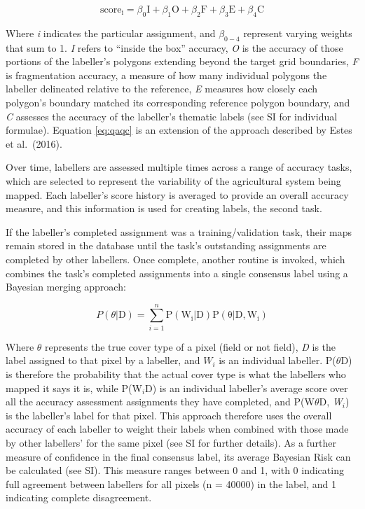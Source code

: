 \documentclass[11pt,a4paper]{article}
\begin{document}
\begin{equation} \label{eq:qaqc}
\mathrm{score_i}=\beta_0\mathrm{I}+\beta_1\mathrm{O}+\beta_2\mathrm{F}+\beta_3\mathrm{E}+\beta_4\mathrm{C}
\end{equation}

Where \emph{i} indicates the particular assignment, and \(\beta_{0-4}\)
represent varying weights that sum to 1. \emph{I} refers to ``inside the
box'' accuracy, \emph{O} is the accuracy of those portions of the
labeller's polygons extending beyond the target grid boundaries,
\emph{F} is fragmentation accuracy, a measure of how many individual
polygons the labeller delineated relative to the reference, \emph{E}
measures how closely each polygon's boundary matched its corresponding
reference polygon boundary, and \emph{C} assesses the accuracy of the
labeller's thematic labels (see SI for individual formulae). Equation
\ref{eq:qaqc} is an extension of the approach described by Estes et
al.~(2016).

Over time, labellers are assessed multiple times across a range of
accuracy tasks, which are selected to represent the variability of the
agricultural system being mapped. Each labeller's score history is
averaged to provide an overall accuracy measure, and this information is
used for creating labels, the second task.

If the labeller's completed assignment was a training/validation task,
their maps remain stored in the database until the task's outstanding
assignments are completed by other labellers. Once complete, another
routine is invoked, which combines the task's completed assignments into
a single consensus label using a Bayesian merging approach:

\begin{equation}
P(\theta|\mathrm{D})=\sum_{i=1}^{n}\mathrm{P}(\mathrm{W_i}|\mathrm{D})\mathrm{P}(\mathrm{\theta}|\mathrm{D}, \mathrm{W_i})
\end{equation}

Where \(\theta\) represents the true cover type of a pixel (field or not
field), \emph{D} is the label assigned to that pixel by a labeller, and
\(W_i\) is an individual labeller. P(\(\theta\)\textbar D) is therefore
the probability that the actual cover type is what the labellers who
mapped it says it is, while P(W\(_i\)\textbar D) is an individual
labeller's average score over all the accuracy assessment assignments
they have completed, and P(W\(\theta\)\textbar D, \emph{W}\(_i\)) is the
labeller's label for that pixel. This approach therefore uses the
overall accuracy of each labeller to weight their labels when combined
with those made by other labellers' for the same pixel (see SI for
further details). As a further measure of confidence in the final
consensus label, its average Bayesian Risk can be calculated (see SI).
This measure ranges between 0 and 1, with 0 indicating full agreement
between labellers for all pixels (n = 40000) in the label, and 1
indicating complete disagreement.
\end{document}
